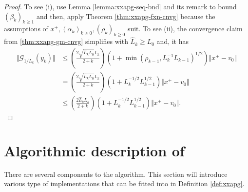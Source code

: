 \documentclass[12pt]{report}
\begin{document}
        \begin{proof}
            To see (i), use Lemma \ref{lemma:xxapg-seq-bnd} and its remark to bound $(\beta_k)_{k \ge 1}$ and then, apply Theorem \ref{thm:xxapg-fxn-cnvg} because the assumptions of $x^+, (\alpha_k)_{k \ge 0}, (\rho_k)_{k \ge 0}$ suit. 
            To see (ii), the convergence claim from \ref{thm:xxapg-gm-cnvg} simplifies with $\widehat L_k \ge L_0$ and, it has 
            \begin{align}
                \Vert \mathcal G_{1/L_k}(y_k) \Vert
                &\le 
                \left(
                    \frac{2\sqrt{\widehat L_kL_0}L_k}{2 + k}
                \right)\left(
                    1 + \min(\rho_{k - 1}, L_k^{-1}L_{k - 1})^{1/2}
                \right)\Vert x^+ - v_0\Vert
                \\
                &= 
                \left(
                    \frac{2\sqrt{\widehat L_kL_0}L_k}{2 + k}
                \right)\left(
                    1 + L_k^{-1/2}L_{k - 1}^{1/2}
                \right)\Vert x^+ - v_0\Vert
                \\
                &\le 
                \left(
                    \frac{2\widehat L_k L_k}{2 + k}
                \right)\left(
                    1 + L_k^{-1/2}L_{k - 1}^{1/2}
                \right)\Vert x^+ - v_0\Vert. 
            \end{align}
        \end{proof}
    
    \section{Algorithmic description of \XXAPG{}}
        There are several components to the \XXAPG{} algorithm. 
        This section will introduce various type of implementations that can be fitted into \XXAPG{} in Definition \ref{def:xxapg}. 
\end{document}
